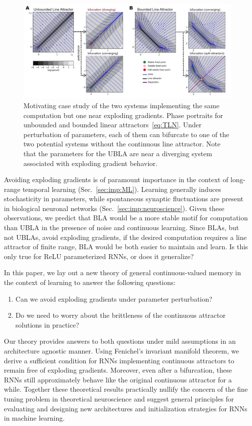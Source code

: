 \documentclass{article} %
\newcounter{ct}
\theoremstyle{definition}
\theoremstyle{remark}
\begin{document}
\begin{figure}[tbhp]
  \centering
  \includegraphics[width=\textwidth]{UBLABLA}
  \caption{Motivating case study of the two systems implementing the same computation but one near exploding gradients.
    Phase portraits for unbounded and bounded linear attractors~\eqref{eq:TLN}.
    Under perturbation of parameters, each of them can bifurcate to one of the two potential systems without the continuous line attractor.
    Note that the parameters for the UBLA are near a diverging system associated with exploding gradient behavior.
}
  \label{fig:ublabla}
\end{figure}

Avoiding exploding gradients is of paramount importance in the context of long-range temporal learning (Sec.~\ref{sec:imp:ML}).
Learning generally induces stochasticity in parameters, while spontaneous synaptic fluctuations are present in biological neuronal networks (Sec.~\ref{sec:imp:neuroscience}).
Given these observations, we predict that BLA would be a more stable motif for computation than UBLA in the presence of noise and continuous learning.
Since BLAs, but not UBLAs, avoid exploding gradients, if the desired computation requires a line attractor of finite range, BLA would be both easier to maintain and learn.
Is this only true for ReLU parameterized RNNs, or does it generalize?

In this paper, we lay out a new theory of general continuous-valued memory in the context of learning to answer the following questions:
\begin{enumerate}
    \item Can we avoid exploding gradients under parameter perturbation?
    \item Do we need to worry about the brittleness of the continuous attractor solutions in practice?
\end{enumerate}
Our theory provides answers to both questions under mild assumptions in an architecture agnostic manner.
Using Fenichel's invariant manifold theorem, we derive a sufficient condition for RNNs implementing continuous attractors to remain free of exploding gradients.
Moreover, even after a bifurcation, these RNNs still approximately behave like the original continuous attractor for a while.
Together these theoretical results practically nullify the concern of the fine tuning problem in theoretical neuroscience and suggest general principles for evaluating and designing new architectures and initialization strategies for RNNs in machine learning.
\end{document}
